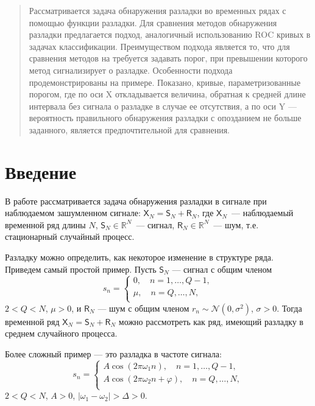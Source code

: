 \documentclass{math-mech-sci}
\newcommand{\X}{\mathsf X}
\renewcommand{\S}{\mathsf S}
\newcommand{\R}{\mathsf R}
\begin{document}
\maketitle

\begin{abstract}
		Рассматривается задача обнаружения разладки во временных рядах с помощью функции разладки. Для сравнения методов обнаружения разладки предлагается подход, аналогичный использованию ROC кривых в
задачах классификации. Преимуществом подхода является то, что для сравнения методов на требуется задавать порог, при превышении которого метод сигнализирует о разладке. Особенности подхода продемонстрированы на примере. Показано, кривые, параметризованные порогом, где по оси X откладывается величина, обратная к средней длине интервала без сигнала о разладке в случае ее отсутствия, а по оси Y --- вероятность правильного обнаружения разладки с опозданием не больше заданного, является предпочтительной для сравнения. 
\end{abstract}

\section{Введение}

В работе рассматривается задача обнаружения разладки в сигнале при наблюдаемом зашумленном сигнале:  $\X_N=\S_N+\R_N$, где $\X_N$~--- наблюдаемый временной ряд длины $N$, $\S_N\in\mathbb R^N$~--- сигнал, $\R_N\in\mathbb R^N$~--- шум, т.е. стационарный случайный процесс.

Разладку можно определить, как некоторое изменение в структуре ряда. Приведем самый простой пример. Пусть $\S_N$ --- сигнал с общим членом
\begin{equation}\label{eq:mu}
s_n=\begin{cases}
 0,\quad n=1,\ldots,Q-1,\\
 \mu,\quad n=Q,\ldots,N,\\
\end{cases}
\end{equation}
$2<Q<N$, $\mu>0$, и $\R_N$ --- шум с общим членом $r_n\sim\mathcal N(0,\sigma^2)$, $\sigma>0$. Тогда временной ряд $\X_N=\S_N+\R_N$ можно рассмотреть как ряд, имеющий разладку в среднем случайного процесса.

Более сложный пример --- это разладка в частоте сигнала: 
\begin{equation}\label{eq:omega}
s_n=\begin{cases}
 A\cos(2\pi\omega_1n),\quad n=1,\ldots,Q-1,\\
 A\cos(2\pi\omega_2n+\varphi),\quad n=Q,\ldots,N,\\
\end{cases}
\end{equation}
$2<Q<N$, $A>0$, $|\omega_1-\omega_2|>\Delta>0$. 
\end{document}
